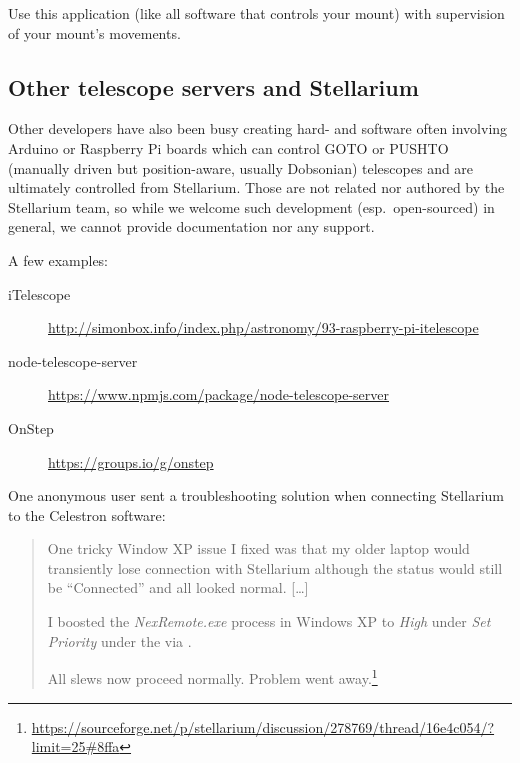 
Use this application (like all software that
controls your mount) with supervision of your mount's movements.

\subsection{Other telescope servers and Stellarium}
\label{sec:plugins:TelescopeControl:Other}

Other developers have also been busy creating hard- and software often
involving Arduino or Raspberry Pi boards which can control GOTO or
PUSHTO (manually driven but position-aware, usually Dobsonian)
telescopes and are ultimately controlled from Stellarium. Those are
not related nor authored by the Stellarium team, so while we welcome
such development (esp.\ open-sourced) in general, we cannot provide
documentation nor any support.

A few examples:
\begin{description}
\item[iTelescope] \url{http://simonbox.info/index.php/astronomy/93-raspberry-pi-itelescope}
\item[node-telescope-server] \url{https://www.npmjs.com/package/node-telescope-server}
\item[OnStep] \url{https://groups.io/g/onstep}
\end{description}

One anonymous user sent a troubleshooting solution when connecting Stellarium to the Celestron  software:
\begin{quote}

  One tricky Window XP issue I fixed was that my older laptop would
  transiently lose connection with Stellarium although the status
  would still be ``Connected'' and all looked normal. [\ldots]


  I boosted the \emph{NexRemote.exe} process in Windows XP to \emph{High} under
  \emph{Set Priority} under the  via
  .

  All slews now proceed normally. Problem went
  away.\footnote{\url{https://sourceforge.net/p/stellarium/discussion/278769/thread/16e4c054/?limit=25\#8ffa}}
\end{quote}



